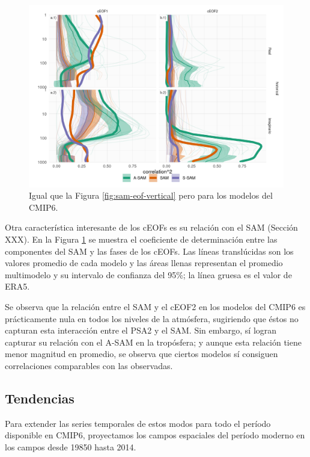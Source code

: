 \documentclass[12pt,oneside]{reedthesis}
\begin{document}
\begin{figure}
\includegraphics{figures/50-cmip6/cor-sam-cmip6-1} \caption{Igual que la Figura \ref{fig:sam-eof-vertical} pero para los modelos del CMIP6.}\label{fig:cor-sam-cmip6}
\end{figure}



Otra característica interesante de los cEOFs es su relación con el SAM (Sección XXX).
En la Figura \ref{fig:cor-sam-cmip6} se muestra el coeficiente de determinación entre las componentes del SAM y las fases de los cEOFs.
Las líneas translúcidas son los valores promedio de cada modelo y las áreas llenas representan el promedio multimodelo y su intervalo de confianza del 95\%; la línea gruesa es el valor de ERA5.

Se observa que la relación entre el SAM y el cEOF2 en los modelos del CMIP6 es prácticamente nula en todos los niveles de la atmósfera, sugiriendo que éstos no capturan esta interacción entre el PSA2 y el SAM.
Sin embargo, sí logran capturar su relación con el A-SAM en la tropósfera; y aunque esta relación tiene menor magnitud en promedio, se observa que ciertos modelos sí consiguen correlaciones comparables con las observadas.

\hypertarget{tendencias}{%
\subsection{Tendencias}\label{tendencias}}

Para extender las series temporales de estos modos para todo el período disponible en CMIP6, proyectamos los campos espaciales del período moderno en los campos desde 19850 hasta 2014.
\end{document}
